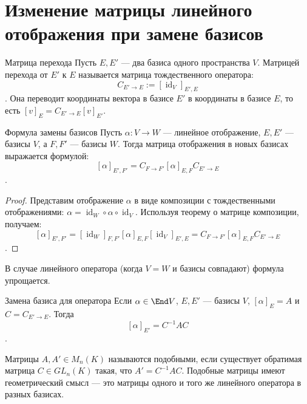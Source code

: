 
\section{Изменение матрицы линейного отображения при замене базисов}

\begin{Definition}{Матрица перехода}{}
	Пусть $E,E'$ --- два базиса одного пространства $V$. Матрицей перехода от $E'$ к $E$ называется матрица тождественного оператора:
	\[
	C_{E'\to E}:=[\operatorname{id}_V]_{E',E}
	\].
	Она переводит координаты вектора в базисе $E'$ в координаты в базисе $E$, то есть $[v]_E=C_{E'\to E}[v]_{E'}$.
\end{Definition}

\begin{Theorem}{Формула замены базисов}{}
	Пусть $\alpha\colon V\to W$ --- линейное отображение, $E,E'$ --- базисы $V$, а $F,F'$ --- базисы $W$. Тогда матрица отображения в новых базисах выражается формулой:
	\[
	[\alpha]_{E',F'} = C_{F\to F'}[\alpha]_{E,F}C_{E'\to E}
	\].
\end{Theorem}

\begin{proof}
	Представим отображение $\alpha$ в виде композиции с тождественными отображениями: $\alpha = \operatorname{id}_W\circ \alpha\circ \operatorname{id}_V$.
	Используя теорему о матрице композиции, получаем:
	\[
	[\alpha]_{E',F'} = [\operatorname{id}_W]_{F,F'} [\alpha]_{E,F} [\operatorname{id}_V]_{E',E} = C_{F\to F'}[\alpha]_{E,F}C_{E'\to E}
	\].
\end{proof}

В случае линейного оператора (когда $V=W$ и базисы совпадают) формула упрощается.

\begin{Corollary}{Замена базиса для оператора}{}
	Если $\alpha\in \End V$, $E,E'$ --- базисы $V$, $[\alpha]_E=A$ и $C=C_{E'\to E}$. Тогда
	\[
	[\alpha]_{E'}=C^{-1}AC
	\].
\end{Corollary}

Матрицы $A,A'\in M_n(K)$ называются подобными, если существует обратимая матрица $C\in GL_n(K)$ такая, что $A'=C^{-1}AC$. Подобные матрицы имеют геометрический смысл — это матрицы одного и того же линейного оператора в разных базисах.
